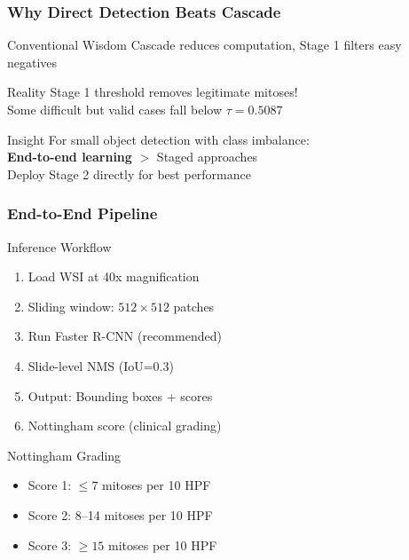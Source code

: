 \documentclass[aspectratio=169,13pt]{beamer}
\begin{document}
\begin{frame}
  \frametitle{Why Direct Detection Beats Cascade}
  
  \begin{block}{Conventional Wisdom}
    Cascade reduces computation, Stage 1 filters easy negatives
  \end{block}
  
  \begin{alertblock}{Reality}
    Stage 1 threshold removes legitimate mitoses!
    \\ Some difficult but valid cases fall below $\tau = 0.5087$
  \end{alertblock}
  
  \begin{block}{Insight}
    For small object detection with class imbalance:
    \\ \textbf{End-to-end learning} $>$ Staged approaches
    \\ Deploy Stage 2 directly for best performance
  \end{block}
\end{frame}

\begin{frame}
  \frametitle{End-to-End Pipeline}
  \begin{block}{Inference Workflow}
    \begin{enumerate}
      \item Load WSI at 40x magnification
      \item Sliding window: $512 \times 512$ patches
      \item Run Faster R-CNN (recommended)
      \item Slide-level NMS (IoU=0.3)
      \item Output: Bounding boxes + scores
      \item Nottingham score (clinical grading)
    \end{enumerate}
  \end{block}
  
  \vspace{0.3cm}
  \begin{block}{Nottingham Grading}
    \begin{itemize}
      \item Score 1: $\leq 7$ mitoses per 10 HPF
      \item Score 2: 8--14 mitoses per 10 HPF
      \item Score 3: $\geq 15$ mitoses per 10 HPF
    \end{itemize}
  \end{block}
\end{frame}
\end{document}
